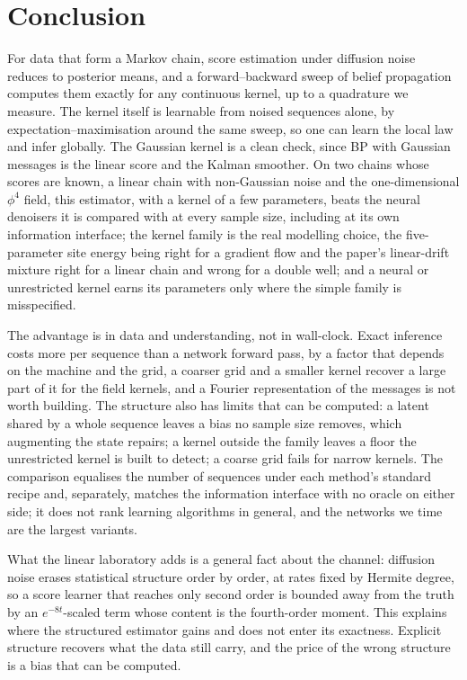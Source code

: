 \section{Conclusion}
\label{sec:conclusion}

For data that form a Markov chain, score estimation under diffusion noise reduces to posterior means, and a forward--backward sweep of
belief propagation computes them exactly for any continuous kernel, up to a quadrature we measure. The kernel itself is learnable from noised
sequences alone, by expectation--maximisation around the same sweep, so one can learn the local law and infer globally. The Gaussian kernel
is a clean check, since BP with Gaussian messages is the linear score and the Kalman smoother. On two chains whose scores are known, a linear chain with
non-Gaussian noise and the one-dimensional $\phi^4$ field, this estimator, with a kernel of a few parameters, beats the neural denoisers it is compared with
at every sample size, including at its own information interface; the kernel family is the real modelling choice, the five-parameter site energy being right for a
gradient flow and the paper's linear-drift mixture right for a linear chain and wrong for a double well; and a neural or unrestricted kernel earns its parameters only where
the simple family is misspecified.

The advantage is in data and understanding, not in wall-clock. Exact inference costs more per sequence than a network forward pass, by a factor that depends on the machine
and the grid, a coarser grid and a smaller kernel recover a large part of it for the field kernels, and a Fourier representation of the messages is not worth building. The
structure also has limits that can be computed: a latent shared by a whole sequence leaves a bias no sample size removes, which augmenting the state repairs; a kernel
outside the family leaves a floor the unrestricted kernel is built to detect; a coarse grid fails for narrow kernels. The comparison equalises the number of sequences under each
method's standard recipe and, separately, matches the information interface with no oracle on either side; it does not rank learning algorithms in general, and the networks
we time are the largest variants.

What the linear laboratory adds is a general fact about the channel: diffusion noise erases statistical structure order by order, at rates fixed by Hermite degree, so a score
learner that reaches only second order is bounded away from the truth by an $e^{-8t}$-scaled term whose content is the fourth-order moment. This explains where the structured
estimator gains and does not enter its exactness. Explicit structure recovers what the data still carry, and the price of the wrong structure is a bias that can be computed.
